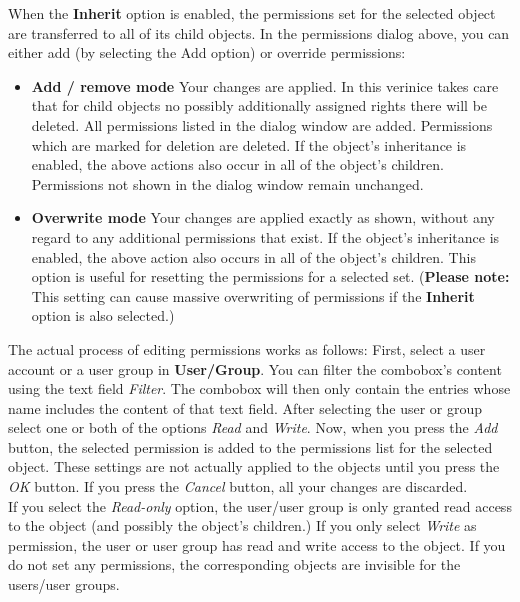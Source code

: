 \documentclass[a4paper,10pt]{book}
\begin{document}
\newline
When the \textbf{Inherit} option is enabled, the permissions set for the selected object are transferred to all of its child objects.
In the permissions dialog above, you can either add (by selecting the Add option) or override permissions:
\begin{itemize}
 \item \textbf{Add / remove mode}
     \subitem Your changes are applied. In this verinice takes care that for child objects no possibly additionally assigned rights there will be deleted. All permissions listed in the dialog window are added. Permissions which are marked for deletion are deleted. If the object’s inheritance is enabled, the above actions also occur in all of the object’s children. Permissions not shown in the dialog window remain unchanged.
 \item \textbf{Overwrite mode}
    \subitem Your changes are applied exactly as shown, without any regard to any additional permissions that exist. If the object’s inheritance is enabled, the above action also occurs in all of the object’s children. This option is useful for resetting the permissions for a selected set. (\textbf{Please note:}
    This setting can cause massive overwriting of permissions if the \textbf{Inherit} option is also selected.)
\end{itemize}
The actual process of editing permissions works as follows: First, select a user account or a user group in \textbf{User/Group}. You can filter the combobox’s content using the text field \textit{Filter}. The combobox will then only contain the entries whose name includes the content of that text field. After selecting the user or group select one or both of the options \textit{Read} and \textit{Write}. Now, when you press the \textit{Add} button, the selected permission is added to the permissions list for the selected object. These settings are not actually applied to the objects until you press the \textit{OK} button. If you press the \textit{Cancel} button, all your changes are discarded.
\newline\\
If you select the \textit{Read-only} option, the user/user group is only granted read access to the object (and possibly the object's children.)
If you only select \textit{Write} as permission, the user or user group has read and write access to the object. If you do not set any permissions,
the corresponding objects are invisible for the users/user groups.
\newline\\
\end{document}
